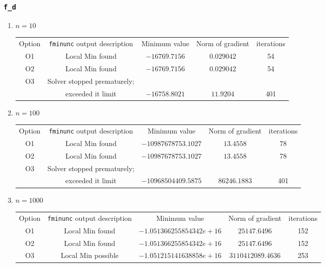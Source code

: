 \documentclass{article}
\begin{document}
    \subsubsection{\texttt{f\_d}}
    \begin{enumerate}
        \item $n=10$
        \begin{center}
        \begin{tabular}{c|c|c|c|c}
        \hline
        Option&\texttt{fminunc} output description&Minimum value&Norm of gradient&iterations\\
        O1&Local Min found&$-16769.7156$&$0.029042$&54\\
        O2&Local Min found&$-16769.7156$&$0.029042$&54\\
        O3&Solver stopped prematurely;&\\ &exceeded it limit&$-16758.8021$&$11.9204$&401\\
        \hline
        \end{tabular}
        \end{center}

        \item $n=100$
        \begin{center}
        \begin{tabular}{c|c|c|c|c}
        \hline
        Option&\texttt{fminunc} output description&Minimum value&Norm of gradient&iterations\\
        O1&Local Min found&$-10987678753.1027$&$13.4558$&78\\
        O2&Local Min found&$-10987678753.1027$&$13.4558$&78\\
        O3&Solver stopped prematurely;&\\ &exceeded it limit&$-10968504409.5875$&$ 86246.1883$&401\\
        \hline
        \end{tabular}
        \end{center}

         \item $n=1000$
        \begin{center}
        \begin{tabular}{c|c|c|c|c}
        \hline
        Option&\texttt{fminunc} output description&Minimum value&Norm of gradient&iterations\\
        O1&Local Min found&$-1.051366255854342e+16$&$25147.6496$&152\\
        O2&Local Min found&$-1.051366255854342e+16$&$25147.6496$&152\\
         O3&Local Min possible&$-1.051215141638858e+16$&$3110412089.4636$&253\\
        \hline
        \end{tabular}
        \end{center}
    \end{enumerate}
    
\end{document}
